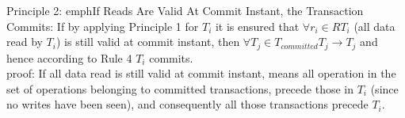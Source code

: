 \documentclass[a4paper, 11pt]{article}
\begin{document}
Principle 2: emph{If Reads Are Valid At Commit Instant, the Transaction Commits}: If by applying Principle 1 for $T_i$ it is ensured that $\forall r_i \in R{T_i}$ (all data read by $T_i$) is still valid at commit instant, then $\forall T_j \in T_{committed} T_j \rightarrow T_j$ and hence according to Rule 4 $T_i$ commits.\\

proof: If all data read is still valid at commit instant, means all operation in the set of operations belonging to committed transactions, precede those in $T_i$ (since no writes have been seen), and consequently all those transactions precede $T_i$.\\ 








\end{document}
